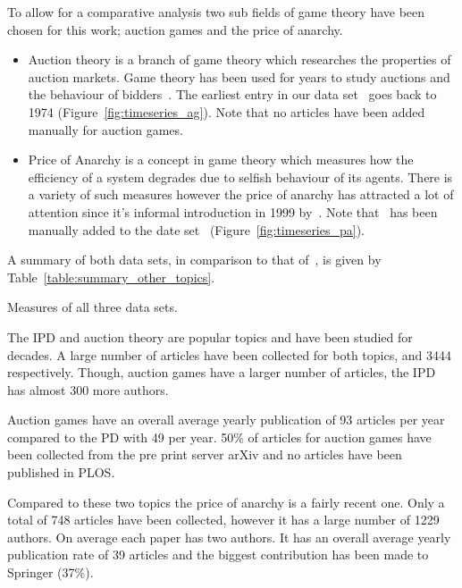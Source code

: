 \documentclass{article}
\theoremstyle{definition}
\newcommand{\totalarticles}{}
\begin{document}
To allow for a comparative analysis two sub fields of game theory have been chosen
for this work; auction games and the price of anarchy.

\begin{itemize}
    \item Auction theory is a branch of game theory which researches the
    properties of auction markets. Game theory has been used for years to study
    auctions and the behaviour of bidders~\cite{Shubik1971}. The earliest entry
    in our data set~\cite{auction_data_2018} goes back to 1974
    (Figure~\ref{fig:timeseries_ag}). Note that no articles have been added
    manually for auction games.
    \item Price of Anarchy is a concept in game theory which measures how the
    efficiency of a system degrades due to selfish behaviour of its agents.
    There is a variety of such measures however the price of anarchy has
    attracted a lot of attention since it's informal introduction in 1999
    by~\cite{Koutsoupias1999}. Note that~\cite{Koutsoupias1999} has been
    manually added to the date set~\cite{anarchy_data_2018}
    (Figure~\ref{fig:timeseries_pa}).
\end{itemize}

A summary of both data sets, in comparison to that of~\cite{pd_data_2018}, is
given by Table~\ref{table:summary_other_topics}.

\begin{table}[!hbtp]
    \centering
    \resizebox{\textwidth}{!}{
    }
    \caption{Measures of all three data sets.}\label{table:summary_other_topics}
\end{table}

The IPD and auction theory are popular topics and have
been studied for decades. A large number of articles have
been collected for both topics, \totalarticles and 3444 respectively. Though, auction
games have a larger number of articles, the IPD
has almost 300 more authors.

Auction games have an overall average yearly publication
of 93 articles per year compared to the PD with 49 per year. 50\% of articles
for auction games have been collected from the pre print server arXiv and no articles have
been published in PLOS.

Compared to these two topics the price of anarchy is a fairly recent one. Only a
total of 748 articles have been collected, however it has a large number
of 1229 authors. On average each paper has two authors. It has an overall average
yearly publication rate of 39 articles and the biggest contribution has been made
to Springer (37\%).
\end{document}

